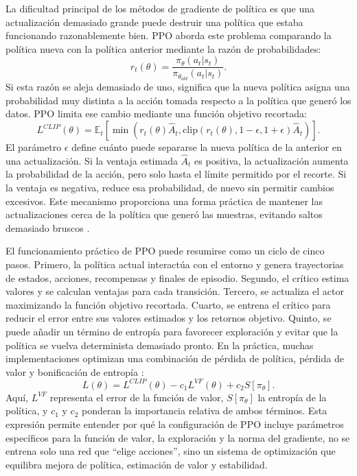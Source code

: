La dificultad principal de los métodos de gradiente de política es que una
actualización demasiado grande puede destruir una política que estaba funcionando
razonablemente bien. PPO aborda este problema comparando la política nueva con la
política anterior mediante la razón de probabilidades:
\[
    r_t(\theta) = \frac{\pi_\theta(a_t|s_t)}{\pi_{\theta_{old}}(a_t|s_t)}.
\]
Si esta razón se aleja demasiado de uno, significa que la nueva política asigna una
probabilidad muy distinta a la acción tomada respecto a la política que generó los
datos. PPO limita ese cambio mediante una función objetivo recortada:
\[
    L^{CLIP}(\theta) = \mathbb{E}_t \left[
    \min\left(r_t(\theta)\hat{A}_t,
    \mathrm{clip}(r_t(\theta), 1-\epsilon, 1+\epsilon)\hat{A}_t\right)
    \right].
\]
El parámetro $\epsilon$ define cuánto puede separarse la nueva política de la
anterior en una actualización. Si la ventaja estimada $\hat{A}_t$ es positiva, la
actualización aumenta la probabilidad de la acción, pero solo hasta el límite
permitido por el recorte. Si la ventaja es negativa, reduce esa probabilidad, de nuevo
sin permitir cambios excesivos. Este mecanismo proporciona una forma práctica de
mantener las actualizaciones cerca de la política que generó las muestras, evitando
saltos demasiado bruscos \cite{schulman2017ppo}.

El funcionamiento práctico de PPO puede resumirse como un ciclo de cinco pasos.
Primero, la política actual interactúa con el entorno y genera trayectorias de
estados, acciones, recompensas y finales de episodio. Segundo, el crítico estima
valores y se calculan ventajas para cada transición. Tercero, se actualiza el actor
maximizando la función objetivo recortada. Cuarto, se entrena el crítico para
reducir el error entre sus valores estimados y los retornos objetivo. Quinto, se
puede añadir un término de entropía para favorecer exploración y evitar que la
política se vuelva determinista demasiado pronto. En la práctica, muchas
implementaciones optimizan una combinación de pérdida de política, pérdida de
valor y bonificación de entropía \cite{schulman2017ppo,stablebaselines3_ppo}:
\[
    L(\theta) = L^{CLIP}(\theta) - c_1 L^{VF}(\theta) + c_2 S[\pi_\theta].
\]
Aquí, \(L^{VF}\) representa el error de la función de valor, \(S[\pi_\theta]\)
la entropía de la política, y \(c_1\) y \(c_2\) ponderan la importancia relativa
de ambos términos. Esta expresión permite entender por qué la configuración de PPO
incluye parámetros específicos para la función de valor, la exploración y la norma
del gradiente, no se entrena solo una red que ``elige acciones'', sino un sistema de
optimización que equilibra mejora de política, estimación de valor y estabilidad.

